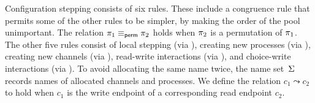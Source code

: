 Configuration stepping consists of six rules. These include a congruence
rule  that permits some of the other rules to be simpler, by making
the order of the pool unimportant. The relation
$\pi_1 \equiv_\textsf{perm} \pi_2$ holds when $\pi_2$ is a permutation of
$\pi_1$.
%
%
The other five rules consist of local stepping (via ),
creating new processes (via ),
creating new channels (via ),
read-write interactions (via ),
and choice-write interactions (via ).
%
To avoid allocating the same name twice, 
the name set~$\Sigma$ records names of allocated channels and processes.
We define the relation
$c_1 \leadsto c_2$ to hold when $c_1$ is the write endpoint of a corresponding
read endpoint $c_2$.

%
%



